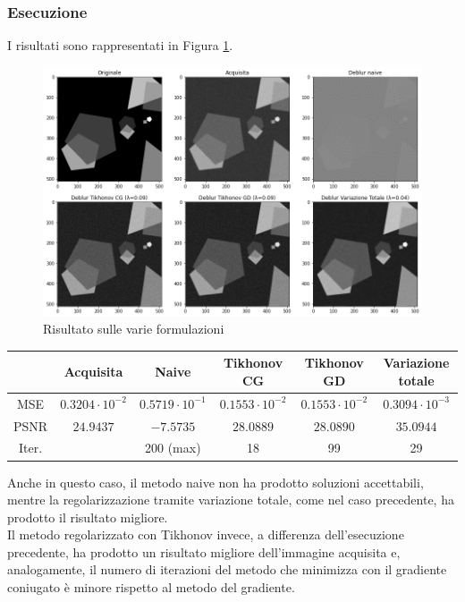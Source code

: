 \documentclass[11pt]{article}
\begin{document}
\subsubsection*{Esecuzione}
I risultati sono rappresentati in Figura \ref{fig:deblur2}.\\
\begin{figure}[H]
    \centering
    \includegraphics[width=13cm]{esecuzione/2/deblur.png}
    \caption{Risultato sulle varie formulazioni}
    \label{fig:deblur2}
\end{figure}

\begin{center}
    \begin{tabular}{ |c|c|c|c|c|c| }
    \hline
    & Acquisita & Naive & Tikhonov CG & Tikhonov GD & Variazione totale \\ 
    \hline
    MSE & $0.3204 \cdot 10^{-2}$ & $0.5719 \cdot 10^{-1}$ & $0.1553 \cdot 10^{-2}$ & $0.1553 \cdot 10^{-2}$ & $0.3094 \cdot 10^{-3}$ \\ 
    PSNR & $24.9437$ & $-7.5735$ & $28.0889$ & $28.0890$ & $35.0944$ \\ 
    Iter. & & 200 (max) & 18 & 99 & 29 \\ 
    \hline
    \end{tabular}
\end{center}

Anche in questo caso, il metodo naive non ha prodotto soluzioni accettabili, mentre la regolarizzazione tramite variazione totale, come nel caso precedente, ha prodotto il risultato migliore.\\
Il metodo regolarizzato con Tikhonov invece, a differenza dell'esecuzione precedente, ha prodotto un risultato migliore dell'immagine acquisita e, 
analogamente, il numero di iterazioni del metodo che minimizza con il gradiente coniugato è minore rispetto al metodo del gradiente.
\end{document}
